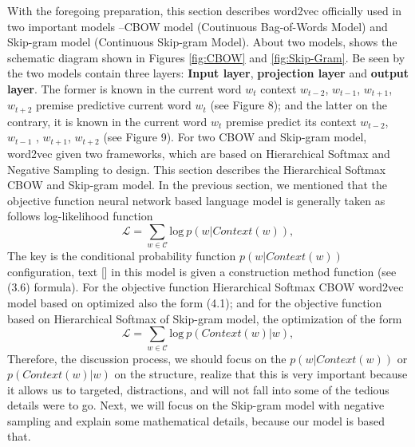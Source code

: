 With the foregoing preparation, this section describes word2vec officially used in two important models --CBOW model (Coutinuous Bag-of-Words Model) and Skip-gram model (Continuous Skip-gram Model). About two models, \cite{mikolov2013distributed} shows the schematic diagram shown in Figures \ref{fig:CBOW} and \ref{fig:Skip-Gram}.
Be seen by the two models contain three layers: \textbf{Input layer}, \textbf{projection layer}  and \textbf{output layer}. The former is known in the current word $w_t$ context $w_{t-2}$, $w_{t-1}$, $w_{t+1}$, $w_{t+2}$ premise predictive current word $w_t$ (see Figure 8); and the latter on the contrary, it is known in the current word $w_t$ premise predict its context $w_{t-2}$, $w_{t-1}$ , $w_{t+1}$, $w_{t+2}$ (see Figure 9).
For two CBOW and Skip-gram model, word2vec given two frameworks, which are based on Hierarchical Softmax and Negative Sampling to design. This section describes the Hierarchical Softmax CBOW and Skip-gram model.
In the previous section, we mentioned that the objective function neural network based language model is generally taken as follows log-likelihood function
$$\mathcal{L}=\sum_{w\in\mathcal{C}}\mathrm{log}\ p(w|Context(w)), $$
The key is the conditional probability function $p(w|Context(w))$ configuration, text [] in this model is given a construction method function (see (3.6) formula).
For the objective function Hierarchical Softmax CBOW word2vec model based on optimized also the form (4.1); and for the objective function based on Hierarchical Softmax of Skip-gram model, the optimization of the form
$$\mathcal{L}=\sum_{w\in\mathcal{C}}\mathrm{log}\ p(Context(w)|w), $$
Therefore, the discussion process, we should focus on the $p(w|Context(w))$ or $p(Context(w)|w)$ on the structure, realize that this is very important because it allows us to targeted, distractions, and will not fall into some of the tedious details were to go. Next, we will focus on the Skip-gram model with negative sampling and explain some mathematical details, because our model is based that.

